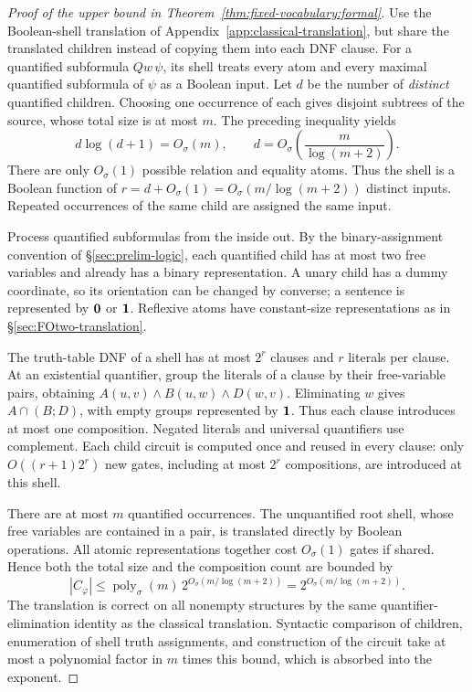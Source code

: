 \begin{proof}[Proof of the upper bound in Theorem~\ref{thm:fixed-vocabulary:formal}]
Use the Boolean-shell translation of
Appendix~\ref{app:classical-translation}, but share the translated
children instead of copying them into each DNF clause.
For a quantified subformula $Qw\,\psi$, its shell treats every atom
and every maximal quantified subformula of $\psi$ as a Boolean input.
Let $d$ be the number of \emph{distinct} quantified children.
Choosing one occurrence of each gives disjoint subtrees of the source,
whose total size is at most $m$. The preceding inequality yields
\[
 d\log(d+1)=O_\sigma(m),
 \qquad d=O_\sigma\!\left(\frac{m}{\log(m+2)}\right).
\]
There are only $O_\sigma(1)$ possible relation and equality atoms.
Thus the shell is a Boolean function of
$r=d+O_\sigma(1)=O_\sigma(m/\log(m+2))$ distinct inputs.
Repeated occurrences of the same child are assigned the same input.

Process quantified subformulas from the inside out. By the
binary-assignment convention of \S\ref{sec:prelim-logic}, each
quantified child has at most two free variables and already has a
binary representation. A unary child has a dummy coordinate, so its
orientation can be changed by converse; a sentence is represented
by $\mathbf{0}$ or $\mathbf{1}$. Reflexive atoms have constant-size
representations as in \S\ref{sec:FOtwo-translation}.

The truth-table DNF of a shell has at most $2^r$ clauses and $r$
literals per clause. At an existential quantifier, group the literals
of a clause by their free-variable pairs, obtaining
$A(u,v)\land B(u,w)\land D(w,v)$. Eliminating $w$ gives
$A\cap(B;D)$, with empty groups represented by $\mathbf{1}$.
Thus each clause introduces at most one composition.
Negated literals and universal quantifiers use complement.
Each child circuit is computed once and reused in every clause:
only $O((r+1)2^r)$ new gates, including at most $2^r$ compositions,
are introduced at this shell.

There are at most $m$ quantified occurrences. The unquantified root
shell, whose free variables are contained in a pair, is translated
directly by Boolean operations. All atomic representations together
cost $O_\sigma(1)$ gates if shared. Hence both the total size and the
composition count are bounded by
\[
 |C_\varphi|
 \le \operatorname{poly}_\sigma(m)\,
       2^{O_\sigma(m/\log(m+2))}
 =2^{O_\sigma(m/\log(m+2))}.
\]
The translation is correct on all nonempty structures by the same
quantifier-elimination identity as the classical translation.
Syntactic comparison of children, enumeration of shell truth
assignments, and construction of the circuit take at most a polynomial
factor in $m$ times this bound, which is absorbed into the exponent.
\end{proof}


